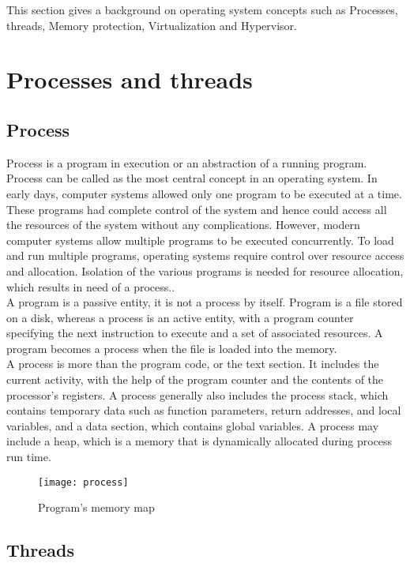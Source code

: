 This section gives a background on operating system concepts such as Processes, threads, Memory protection, Virtualization and Hypervisor.

\section{Processes and threads}

\subsection{Process}

Process is a program in execution or an abstraction of a running program. Process can be called as the most central concept in an operating system. In early days, computer systems allowed only one program to be executed at a time. These programs had complete control of the system and hence could access all the resources of the system without any complications. However, modern computer systems allow multiple programs to be executed concurrently. To load and run multiple programs, operating systems require control over resource access and allocation. Isolation of the various programs is needed for resource allocation, which results in need of a process.\cite{Galvin}.
\\
A program is a passive entity, it is not a process by itself. Program is a file stored on a disk, whereas a process is an active entity, with a program counter specifying the next instruction to execute and a set of associated resources. A program becomes a process when the file is loaded into the memory\cite{Galvin}.
\\
A process is more than the program code, or the text section. It includes the current activity, with the help of the program counter and the contents of the processor's registers. A process generally also includes the process stack, which contains temporary data such as function parameters, return addresses, and local variables, and a data section, which contains global variables. A process may include a heap, which is a memory that is dynamically allocated during process run time\cite{Galvin}.
\begin{figure}[!ht]
\centering
\texttt{[image: process]}
\caption{Program's memory map}
\label{fig:process}
\end{figure}

\subsection{Threads}

